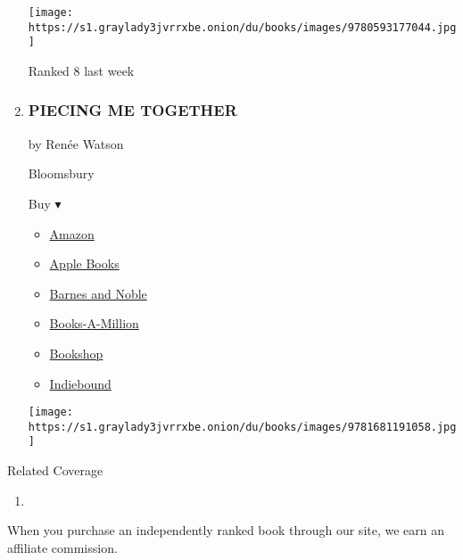 \begin{enumerate}
  \texttt{[image: https://s1.graylady3jvrrxbe.onion/du/books/images/9780593177044.jpg]}

  Ranked 8 last week
\item
  \hypertarget{piecing-me-together}{%
  \subsubsection{PIECING ME TOGETHER}\label{piecing-me-together}}

  by Renée Watson

  Bloomsbury

  Buy ▾

  \begin{itemize}
  \tightlist
  \item
    \href{https://www.amazon.com/Piecing-Me-Together-Renée-Watson/dp/1681191059?tag=NYTBS-20}{Amazon}
  \item
    \href{https://du-gae-books-dot-nyt-du-prd.appspot.com/buy?title=PIECING+ME+TOGETHER\&author=Ren\%C3\%A9e+Watson}{Apple
    Books}
  \item
    \href{https://www.anrdoezrs.net/click-7990613-11819508?url=https\%3A\%2F\%2Fwww.barnesandnoble.com\%2Fw\%2F\%3Fean\%3D9781681191072}{Barnes
    and Noble}
  \item
    \href{https://www.anrdoezrs.net/click-7990613-35140?url=https\%3A\%2F\%2Fwww.booksamillion.com\%2Fp\%2FPIECING\%2BME\%2BTOGETHER\%2FRen\%25C3\%25A9e\%2BWatson\%2F9781681191072}{Books-A-Million}
  \item
    \href{https://bookshop.org/a/3546/9781681191072}{Bookshop}
  \item
    \href{https://www.indiebound.org/book/9781681191072?aff=NYT}{Indiebound}
  \end{itemize}

  \texttt{[image: https://s1.graylady3jvrrxbe.onion/du/books/images/9781681191058.jpg]}
\end{enumerate}

Related Coverage

\begin{enumerate}
\def\labelenumi{\arabic{enumi}.}
\tightlist
\item
  \href{https://www.nytimes3xbfgragh.onion/2020/07/31/books/review/the-system-robert-reich-break-em-up-zephyr-teachout.html}{}
\end{enumerate}

When you purchase an independently ranked book through our site, we earn
an affiliate commission.

